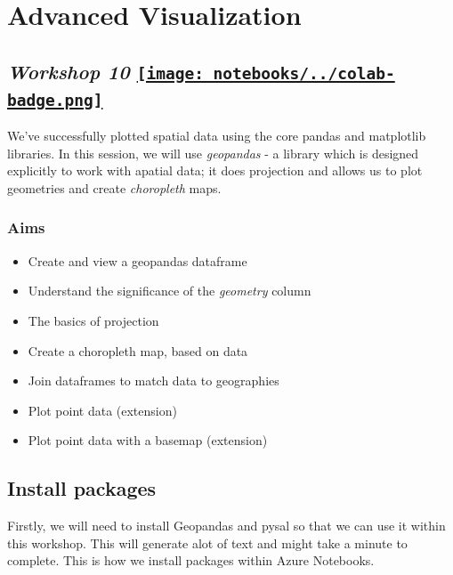 \documentclass[
  letterpaper,
  DIV=11,
  numbers=noendperiod]{scrreprt}
\providecommand{\tightlist}{%
  \setlength{\itemsep}{0pt}\setlength{\parskip}{0pt}}\usepackage{longtable,booktabs,array}
\begin{document}

\hypertarget{advanced-visualization}{%
\chapter{Advanced Visualization}\label{advanced-visualization}}

\hypertarget{workshop-10-open-in-colab}{%
\section[\emph{Workshop 10} ]{\texorpdfstring{\emph{Workshop 10}
\href{https://colab.research.google.com/github/oballinger/QM2/blob/main/notebooks/W10.\%20Advanced\%20Visualization.ipynb}{\protect\texttt{[image: notebooks/../colab-badge.png]}}}{Workshop 10 Open In Colab}}\label{workshop-10-open-in-colab}}

We've successfully plotted spatial data using the core pandas and
matplotlib libraries. In this session, we will use \emph{geopandas} - a
library which is designed explicitly to work with apatial data; it does
projection and allows us to plot geometries and create \emph{choropleth}
maps.

\hypertarget{aims-4}{%
\subsection{Aims}\label{aims-4}}

\begin{itemize}
\tightlist
\item
  Create and view a geopandas dataframe
\item
  Understand the significance of the \emph{geometry} column
\item
  The basics of projection
\item
  Create a choropleth map, based on data
\item
  Join dataframes to match data to geographies
\item
  Plot point data (extension)
\item
  Plot point data with a basemap (extension)
\end{itemize}

\hypertarget{install-packages}{%
\section{Install packages}\label{install-packages}}

Firstly, we will need to install Geopandas and pysal so that we can use
it within this workshop. This will generate alot of text and might take
a minute to complete. This is how we install packages within Azure
Notebooks.
\end{document}
